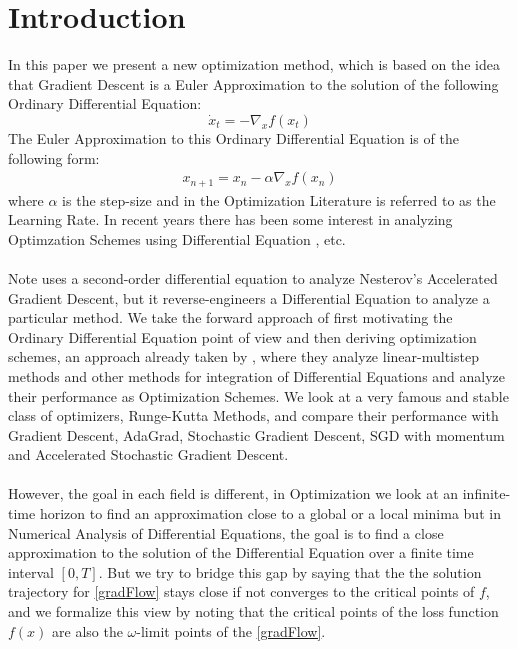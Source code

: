 \section{Introduction}
In this paper we present a new optimization method, which is based on the idea that Gradient Descent is a Euler Approximation to the solution of the following Ordinary Differential Equation:
\begin{equation}\label{gradFlow}
\dot{x}_t = -\nabla_{x}f(x_t)
\end{equation}
The Euler Approximation to this Ordinary Differential Equation is of the following form:
\begin{align*}
x_{n+1} =  x_n - \alpha \nabla_{x}f(x_n)
\end{align*}
where $\alpha$ is the step-size and in the Optimization Literature is referred to as the Learning Rate. In recent years there has been some interest in analyzing Optimzation Schemes using Differential Equation \cite{su2014}, etc.
\\
\\
Note \cite{su2014} uses a second-order differential equation to analyze Nesterov's Accelerated Gradient Descent, but it reverse-engineers a Differential Equation to analyze a particular method. We take the forward approach of first motivating the Ordinary Differential Equation point of view and then deriving optimization schemes, an approach already taken by \cite{alex2017}, where they analyze linear-multistep methods and other methods for integration of Differential Equations and analyze their performance as Optimization Schemes. We look at a very famous and stable class of optimizers, Runge-Kutta Methods, and compare their performance with Gradient Descent, AdaGrad, Stochastic Gradient Descent, SGD with momentum and Accelerated Stochastic Gradient Descent.
\\
\\
However, the goal in each field is different, in Optimization we look at an infinite-time horizon to find an approximation close to a global or a local minima but in Numerical Analysis of Differential Equations, the goal is to find a close approximation to the solution of the Differential Equation over a finite time interval $[0, T]$. But we try to bridge this gap by saying that the the solution trajectory for \eqref{gradFlow} stays close if not converges to the critical points of $f$, and we formalize this view by noting that the critical points of the loss function $f(x)$ are also the $\omega$-limit points of the \eqref{gradFlow}.
\\
\\
